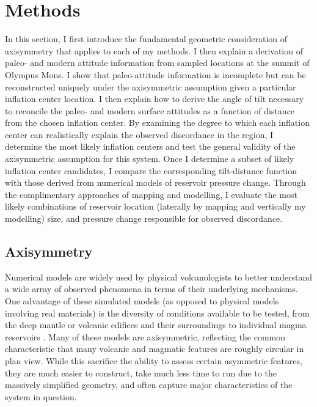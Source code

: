 \chapter{Methods}\label{cha:methods}

In this section, I first introduce the fundamental geometric consideration of axisymmetry that applies to each of my methods. I then explain a derivation of paleo- and modern attitude information from sampled locations at the summit of Olympus Mons. I show that paleo-attitude information is incomplete but can be reconstructed uniquely under the axisymmetric assumption given a particular inflation center location. I then explain how to derive the angle of tilt necessary to reconcile the paleo- and modern surface attitudes as a function of distance from the chosen inflation center. By examining the degree to which each inflation center can realistically explain the observed discordance in the region, I determine the most likely inflation centers and test the general validity of the axisymmetric assumption for this system. Once I determine a subset of likely inflation center candidates, I compare the corresponding tilt-distance function with those derived from numerical models of reservoir pressure change. Through the complimentary approaches of mapping and modelling, I evaluate the most likely combinations of reservoir location (laterally by mapping and vertically my modelling) size, and pressure change responsible for observed discordance. 

\section{Axisymmetry}

Numerical models are widely used by physical volcanologists to better understand a wide array of observed phenomena in terms of their underlying mechanisms. One advantage of these simulated models (as opposed to physical models involving real materials) is the diversity of conditions available to be tested, from the deep mantle \parencite[e.g.,][]{redmond_numerical_2004,ogawa_four-stage_2021} or volcanic edifices and their surroundings \parencite[e.g.,][]{isherwood_volcanic_2013} to individual magma reservoirs \parencite[e.g.,][]{grosfils_magma_2007,grosfils_elastic_2015}. Many of these models are axisymmetric, reflecting the common characteristic that many volcanic and magmatic features are roughly circular in plan view. While this sacrifice the ability to assess certain asymmetric features, they are much easier to construct, take much less time to run due to the massively simplified geometry, and often capture major characteristics of the system in question.

